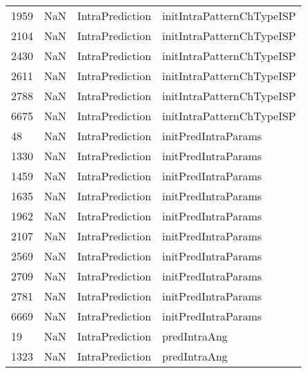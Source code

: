 \begin{tabular}{llll}
1959 &                   NaN &            IntraPrediction &                 initIntraPatternChTypeISP \\
2104 &                   NaN &            IntraPrediction &                 initIntraPatternChTypeISP \\
2430 &                   NaN &            IntraPrediction &                 initIntraPatternChTypeISP \\
2611 &                   NaN &            IntraPrediction &                 initIntraPatternChTypeISP \\
2788 &                   NaN &            IntraPrediction &                 initIntraPatternChTypeISP \\
6675 &                   NaN &            IntraPrediction &                 initIntraPatternChTypeISP \\
48   &                   NaN &            IntraPrediction &                       initPredIntraParams \\
1330 &                   NaN &            IntraPrediction &                       initPredIntraParams \\
1459 &                   NaN &            IntraPrediction &                       initPredIntraParams \\
1635 &                   NaN &            IntraPrediction &                       initPredIntraParams \\
1962 &                   NaN &            IntraPrediction &                       initPredIntraParams \\
2107 &                   NaN &            IntraPrediction &                       initPredIntraParams \\
2569 &                   NaN &            IntraPrediction &                       initPredIntraParams \\
2709 &                   NaN &            IntraPrediction &                       initPredIntraParams \\
2781 &                   NaN &            IntraPrediction &                       initPredIntraParams \\
6669 &                   NaN &            IntraPrediction &                       initPredIntraParams \\
19   &                   NaN &            IntraPrediction &                              predIntraAng \\
1323 &                   NaN &            IntraPrediction &                              predIntraAng \\

\end{tabular}
